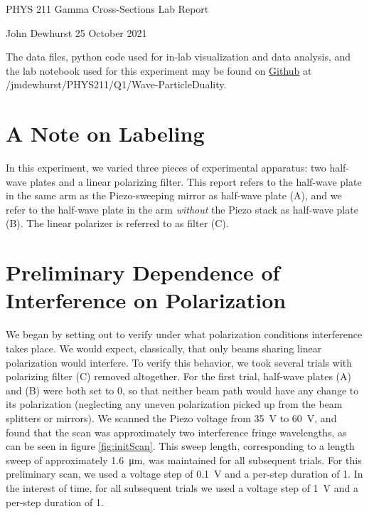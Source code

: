 \documentclass[letter]{article}
\begin{document}

\begin{center}
	{\large PHYS 211 Gamma Cross-Sections Lab Report}
	
	John Dewhurst \hspace{1cm}
	25 October 2021
	
	\vspace{1em}
	
	The data files, python code used for in-lab visualization and data analysis, and the lab notebook used for this experiment may be found on \href{https://github.com/jmdewhurst/PHYS211.git}{Github} at /jmdewhurst/PHYS211/Q1/Wave-ParticleDuality.
	
	\vspace{1em}
\end{center}
	

\setcounter{section}{-1}
\section{A Note on Labeling}
In this experiment, we varied three pieces of experimental apparatus: two half-wave plates and a linear polarizing filter. This report refers to the half-wave plate in the same arm as the Piezo-sweeping mirror as half-wave plate (A), and we refer to the half-wave plate in the arm \textit{without} the Piezo stack as half-wave plate (B). The linear polarizer is referred to as filter (C).

\section{Preliminary Dependence of Interference on Polarization}

We began by setting out to verify under what polarization conditions interference takes place. We would expect, classically, that only beams sharing linear polarization would interfere. To verify this behavior, we took several trials with polarizing filter (C) removed altogether. For the first trial, half-wave plates (A) and (B) were both set to \qty{0}{\deg}, so that neither beam path would have any change to its polarization (neglecting any uneven polarization picked up from the beam splitters or mirrors). We scanned the Piezo voltage from \qty{35}{\volt} to \qty{60}{\volt}, and found that the scan was approximately two interference fringe wavelengths, as can be seen in figure \ref{fig:initScan}. This sweep length, corresponding to a length sweep of approximately \qty{1.6}{\um}, was maintained for all subsequent trials. For this preliminary scan, we used a voltage step of \qty{0.1}{\volt} and a per-step duration of \qty{1}{\sec}. In the interest of time, for all subsequent trials we used a voltage step of \qty{1}{\volt} and a per-step duration of \qty{1}{\sec}.
\end{document}
